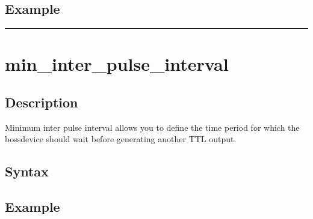\documentclass[letterpaper,10pt,english]{sphinxmanual}
\begin{document}
\subsection{Example}
\label{\detokenize{4_api_documentation:id50}}
\begin{sphinxVerbatim}[commandchars=\\\{\}]
\end{sphinxVerbatim}


\bigskip\hrule\bigskip



\section{min\_inter\_pulse\_interval}
\label{\detokenize{4_api_documentation:min-inter-pulse-interval}}

\subsection{Description}
\label{\detokenize{4_api_documentation:id51}}
\sphinxAtStartPar
Minimum inter pulse interval allows you to define the time period for which the bossdevice should wait before generating another TTL output.


\subsection{Syntax}
\label{\detokenize{4_api_documentation:id52}}
\begin{sphinxVerbatim}[commandchars=\\\{\}]
\PYG{p}{[}\PYG{p}{]}
\end{sphinxVerbatim}


\subsection{Example}
\label{\detokenize{4_api_documentation:id53}}
\begin{sphinxVerbatim}[commandchars=\\\{\}]
\end{sphinxVerbatim}
\end{document}
